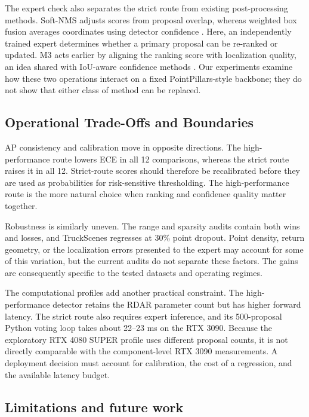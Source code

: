 \documentclass[sensors,article,submit,pdftex,moreauthors]{Definitions/mdpi}
\begin{document}
The expert check also separates the strict route from existing post-processing
methods. Soft-NMS adjusts scores from proposal overlap, whereas weighted box
fusion averages coordinates using detector confidence
\cite{bodla2017softnms,solovyev2021wbf}. Here, an independently trained expert
determines whether a primary proposal can be re-ranked or updated. M3 acts
earlier by aligning the ranking score with localization quality, an idea shared
with IoU-aware confidence methods \cite{jiang2018iounet,li2022gfl}. Our
experiments examine how these two operations interact on a fixed
PointPillars-style backbone; they do not show that either class of method can be
replaced.

\subsection{Operational Trade-Offs and Boundaries}

AP consistency and calibration move in opposite directions. The
high-performance route lowers ECE in all 12 comparisons, whereas the strict
route raises it in all 12. Strict-route scores should therefore be recalibrated
before they are used as probabilities for risk-sensitive thresholding. The
high-performance route is the more natural choice when ranking and confidence
quality matter together.

Robustness is similarly uneven. The range and sparsity audits contain both wins
and losses, and TruckScenes regresses at 30\% point dropout. Point density,
return geometry, or the localization errors presented to the expert may account
for some of this variation, but the current audits do not separate these
factors. The gains are consequently specific to the tested datasets and
operating regimes.

The computational profiles add another practical constraint. The
high-performance detector retains the RDAR parameter count but has higher
forward latency. The strict route also requires expert inference, and its
500-proposal Python voting loop takes about 22--23 ms on the RTX 3090. Because
the exploratory RTX 4080 SUPER profile uses different proposal counts, it is not
directly comparable with the component-level RTX 3090 measurements. A deployment
decision must account for calibration, the cost of a regression, and the
available latency budget.

\subsection{Limitations and future work}
\end{document}
